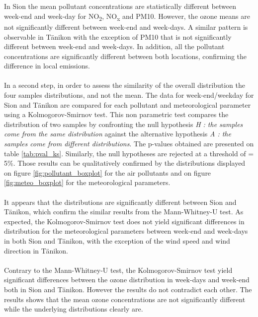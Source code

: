 \documentclass[a4paper, 12pt]{article}
\begin{document}
    \\
    \\
    In Sion the mean pollutant concentrations are statistically different between week-end and week-day for NO\textsubscript{2}, NO\textsubscript{x} and PM10. However, the ozone means are not significantly different between week-end and week-days. A similar pattern is observable in Tänikon with the exception of PM10 that is not significantly different between week-end and week-days. In addition, all the pollutant concentrations are significantly different between both locations, confirming the difference in local emissions. 
    \\
    \\
    In a second step, in order to assess the similarity of the overall distribution the four samples distributions, and not the mean. The data for  week-end/weekday for Sion and Tänikon are compared for each pollutant and meteorological parameter using a Kolmogorov-Smirnov test. This non parametric test compares the distribution of two samples by confronting the null hypothesis \textit{H : the samples come from the same distribution} against the alternative hypothesis \textit{A : the samples come from different distributions}. The p-values obtained are presented on table \ref{tab:pval_ks}. Similarly, the null hypotheses are rejected at a threshold of \textalpha = 5\%. Those results can be qualitatively confirmed by the distributions displayed on figure \ref{fig:pollutant_boxplot} for the air pollutants and on figure \ref{fig:meteo_boxplot} for the meteorological parameters. \\
    \\ 
    It appears that the distributions are significantly different between Sion and Tänikon, which confirm the similar results from the Mann-Whitney-U test. As expected, the Kolmogorov-Smirnov test does not yield significant differences in distribution for the meteorological parameters between week-end and week-days in both Sion and Tänikon, with the exception of the wind speed and wind direction in Tänikon. \\
    \\
    Contrary to the Mann-Whitney-U test, the Kolmogorov-Smirnov test yield significant differences between the ozone distribution in week-days and week-end both in Sion and Tänikon. However the results do not contradict each other. The results shows that the mean ozone concentrations are not significantly different while the underlying distributions clearly are. 
    \\
\end{document}
